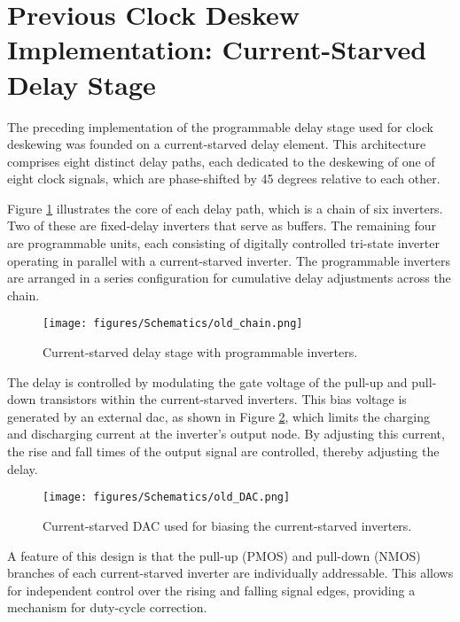 
\section{Previous Clock Deskew Implementation: Current-Starved Delay Stage}

The preceding implementation of the programmable delay stage used for clock deskewing was founded on a current-starved delay element. This architecture comprises eight distinct delay paths, each dedicated to the deskewing of one of eight clock signals, which are phase-shifted by 45 degrees relative to each other.

Figure \ref{fig:current_starved_delay_stage} illustrates the core of each delay path, which is a chain of six inverters. Two of these are fixed-delay inverters that serve as buffers. The remaining four are programmable units, each consisting of digitally controlled tri-state inverter operating in parallel with a current-starved inverter. The programmable inverters are arranged in a series configuration for cumulative delay adjustments across the chain.

\begin{figure}[h]
  \centering
  \texttt{[image: figures/Schematics/old\_chain.png]}
  \caption{Current-starved delay stage with programmable inverters.}
  \label{fig:current_starved_delay_stage}
\end{figure}

The delay is controlled by modulating the gate voltage of the pull-up and pull-down transistors within the current-starved inverters. This bias voltage is generated by an external \gls{dac}, as shown in Figure \ref{fig:current_starved_dac}, which limits the charging and discharging current at the inverter's output node. By adjusting this current, the rise and fall times of the output signal are controlled, thereby adjusting the delay.

\begin{figure}[h]
  \centering
  \texttt{[image: figures/Schematics/old\_DAC.png]}
  \caption{Current-starved DAC used for biasing the current-starved inverters.}
  \label{fig:current_starved_dac}
\end{figure}

A feature of this design is that the pull-up (PMOS) and pull-down (NMOS) branches of each current-starved inverter are individually addressable. This allows for independent control over the rising and falling signal edges, providing a mechanism for duty-cycle correction.

